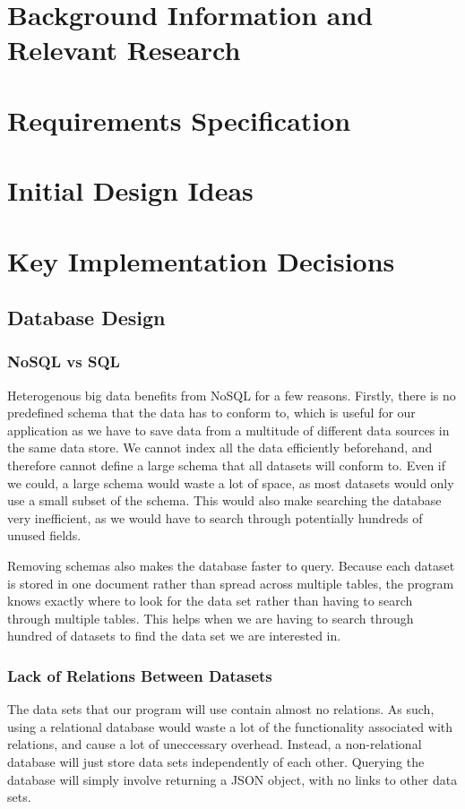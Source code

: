 \documentclass[titlepage]{article}
\begin{document}
\section{Background Information and \\Relevant Research}

\section{Requirements Specification}

\section{Initial Design Ideas}

\section{Key Implementation Decisions}
\subsection{Database Design}

\subsubsection{NoSQL vs SQL}
Heterogenous big data benefits from NoSQL for a few reasons. Firstly, there is no predefined schema that the data has to conform to, which is useful for our application as we have to save data from a multitude of different data sources in the same data store. We cannot index all the data efficiently beforehand, and therefore cannot define a large schema that all datasets will conform to. Even if we could, a large schema would waste a lot of space, as most datasets would only use a small subset of the schema. This would also make searching the database very inefficient, as we would have to search through potentially hundreds of unused fields.

Removing schemas also makes the database faster to query\cite{sqlvsnosql}. Because each dataset is stored in one document rather than spread across multiple tables, the program knows exactly where to look for the data set rather than having to search through multiple tables. This helps when we are having to search through hundred of datasets to find the data set we are interested in.

\subsubsection{Lack of Relations Between Datasets}
The data sets that our program will use contain almost no relations. As such, using a relational database would waste a lot of the functionality associated with relations, and cause a lot of uneccessary overhead. Instead, a non-relational database will just store data sets independently of each other. Querying the database will simply involve returning a JSON object, with no links to other data sets.
\end{document}
